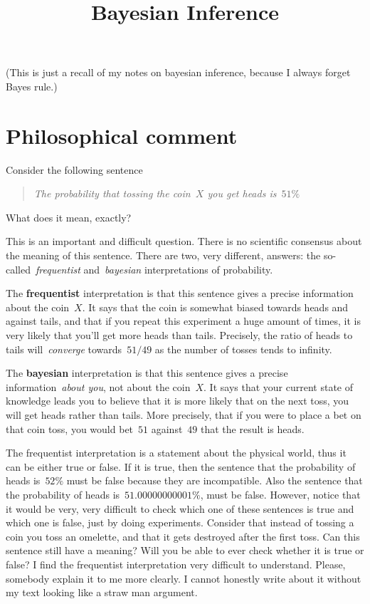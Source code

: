 \title{Bayesian Inference}

(This is just a recall of my notes on bayesian inference, because I always
forget Bayes rule.)

\section{Philosophical comment}

Consider the following sentence

\begin{quote}
\emph{The probability that tossing the coin~$X$ you get heads is~$51\%$}
\end{quote}

What does it mean, exactly?

This is an important and difficult question.  There is no scientific
consensus about the meaning of this sentence.  There are two, very different,
answers: the so-called~\emph{frequentist} and~\emph{bayesian} interpretations
of probability.

The {\bf frequentist} interpretation is that this sentence gives a precise
information about the coin~$X$.  It says that the coin is somewhat biased
towards heads and against tails, and that if you repeat this experiment a
huge amount of times, it is very likely that you'll get more heads than
tails.  Precisely, the ratio of heads to tails will~\emph{converge}
towards~$51/49$ as the number of tosses tends to infinity.

The {\bf bayesian} interpretation is that this sentence gives a precise
information~\emph{about you}, not about the coin~$X$.  It says that your
current state of knowledge leads you to believe that it is more likely that
on the next toss, you will get heads rather than tails.  More precisely, that
if you were to place a bet on that coin toss, you would bet~$51$ against~$49$
that the result is heads.

The frequentist interpretation is a statement about the physical world, thus
it can be either true or false.  If it is true, then the sentence that the
probability of heads is~$52\%$ must be false because they are incompatible.
Also the sentence that the probability of heads is~$51.00000000001\%$, must
be false.  However, notice that it would be very, very difficult to check
which one of these sentences is true and which one is false, just by doing
experiments.  Consider that instead of tossing a coin you toss an omelette,
and that it gets destroyed after the first toss.  Can this sentence still
have a meaning?  Will you be able to ever check whether it is true or false?
I find the frequentist interpretation very difficult to understand.  Please,
somebody explain it to me more clearly.  I cannot honestly write about it
without my text looking like a straw man argument.

